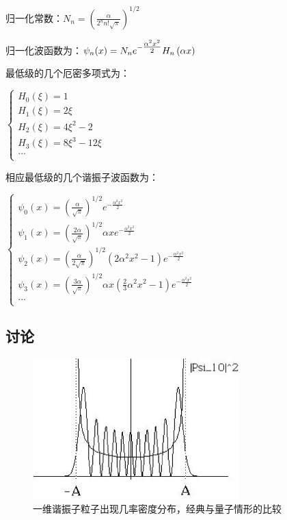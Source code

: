 归一化常数：$N_n  = \left( {\frac{\alpha }{{2^n n!\sqrt \pi  }}} \right)^{1/2} $

归一化波函数为：$\psi _n (x) = N_n e^{ - {\textstyle{{\alpha ^2 x^2 } \over 2}}} H_n \left( {\alpha x} \right)$

最低级的几个厄密多项式为：


\begin{center}
$
\left\{ \begin{array}{l}
 H_0 (\xi ) = 1 \\
 H_1 (\xi ) = 2\xi  \\
 H_2 (\xi ) = 4\xi ^2  - 2 \\
 H_3 (\xi ) = 8\xi ^3  - 12\xi  \\
 ... \\
 \end{array} \right.
$
\end{center}

相应最低级的几个谐振子波函数为：


\begin{center}
$
\left\{ \begin{array}{l}
 \psi _0 (x) = \left( {\frac{\alpha }{{\sqrt \pi  }}} \right)^{1/2} e^{ - \frac{{\alpha ^2 x^2 }}{2}}  \\
 \psi _1 (x) = \left( {\frac{{2\alpha }}{{\sqrt \pi  }}} \right)^{1/2} \alpha xe^{ - \frac{{\alpha ^2 x^2 }}{2}}  \\
 \psi _2 (x) = \left( {\frac{\alpha }{{2\sqrt \pi  }}} \right)^{1/2} \left( {2\alpha ^2 x^2  - 1} \right)e^{ - \frac{{\alpha ^2 x^2 }}{2}}  \\
 \psi _3 (x) = \left( {\frac{{3\alpha }}{{\sqrt \pi  }}} \right)^{1/2} \alpha x\left( {\frac{2}{3}\alpha ^2 x^2  - 1} \right)e^{ - \frac{{\alpha ^2 x^2 }}{2}}  \\
 ... \\
 \end{array} \right.
$
\end{center}



\subsection{讨论}

\begin{figure}[h]
\begin{center}
\includegraphics[clip,width=8cm]{1DProblem/10-2.ps}
\caption{一维谐振子粒子出现几率密度分布，经典与量子情形的比较}
\end{center}
\end{figure}


